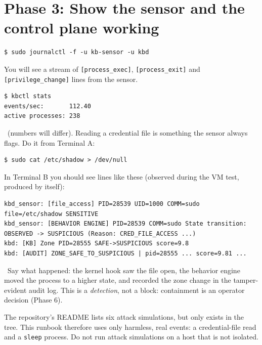 \section{Phase 3: Show the sensor and the control plane working}
\resetsteps
{}
\begin{lstlisting}[style=console]
$ sudo journalctl -f -u kb-sensor -u kbd
\end{lstlisting}
You will see a stream of \texttt{[process\_exec]}, \texttt{[process\_exit]} and \texttt{[privilege\_change]} lines from the sensor.
\verified
{}
\begin{lstlisting}[style=console]
$ kbctl stats
events/sec:       112.40
active processes: 238
\end{lstlisting}
\fromsrc\ (numbers will differ).
Reading a credential file is something the sensor always flags. Do it from Terminal A:
\begin{lstlisting}[style=console]
$ sudo cat /etc/shadow > /dev/null
\end{lstlisting}
In Terminal B you should see lines like these (observed during the VM test, produced by  itself):
\begin{lstlisting}[style=console]
kbd_sensor: [file_access] PID=28539 UID=1000 COMM=sudo file=/etc/shadow SENSITIVE
kbd_sensor: [BEHAVIOR ENGINE] PID=28539 COMM=sudo State transition: OBSERVED -> SUSPICIOUS (Reason: CRED_FILE_ACCESS ...)
kbd: [KB] Zone PID=28555 SAFE->SUSPICIOUS score=9.8
kbd: [AUDIT] ZONE_SAFE_TO_SUSPICIOUS | pid=28555 ... score=9.81 ...
\end{lstlisting}
\verified\ Say what happened: the kernel hook saw the file open, the behavior engine moved the process to a higher state, and
 recorded the zone change in the tamper-evident audit log. This is a \emph{detection}, not a block: containment is an operator
decision (Phase 6).
\begin{kbnote}
The repository's  README lists six attack simulations, but only  exists in the
tree. This runbook therefore uses only harmless, real events: a credential-file read and a \texttt{sleep} process.
Do not run attack simulations on a host that is not isolated.
\end{kbnote}

